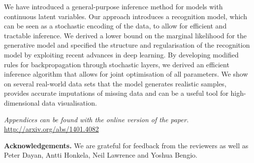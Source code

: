 \documentclass{article}
\begin{document}
\begin{bibunit}[icml2013]
%
%
We have introduced a general-purpose inference method for 
models with continuous latent variables. 
Our approach introduces a recognition model, which can be seen as a stochastic encoding of the data, to allow for efficient and tractable inference. 
We derived a lower bound on the marginal likelihood for the generative model and specified the structure and regularisation of the recognition model by exploiting recent advances in deep learning. 
By developing modified rules for backpropagation through stochastic 
layers, we derived an efficient inference algorithm that allows for joint 
optimisation of all parameters.
We show on several real-world data sets that the
model generates realistic samples, provides accurate imputations of 
missing data and can be a useful tool for high-dimensional data visualisation. 

\small{
\textit{Appendices can be found with the online version of the paper.} \url{http://arxiv.org/abs/1401.4082} }

\small{
\textbf{Acknowledgements.} 
We are grateful for feedback from the reviewers as well as Peter Dayan, Antti Honkela, Neil Lawrence and Yoshua Bengio. }

\clearpage
\small
\balance
\putbib
\end{bibunit}
\end{document}

